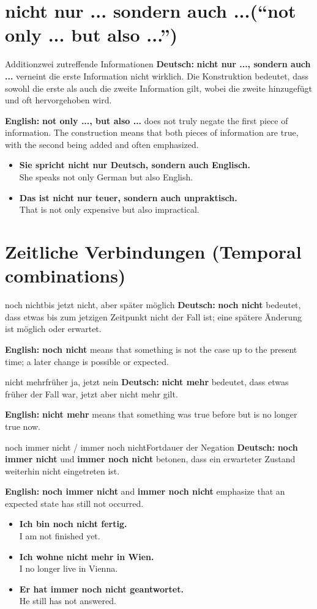 \documentclass[a4paper,11pt]{article}
\newcommand{\GermanText}[1]{\textbf{Deutsch: }#1\par}
\newcommand{\EnglishText}[1]{{\small\color{SoftGray}\textbf{English: }#1\par}}
\newcommand{\ExampleItem}[2]{\item \textbf{#1}\\{\small\color{SoftGray}#2}}
\begin{document}
\section{\glqq nicht nur ... sondern auch ...\grqq \textnormal{(``not only ... but also ...'')}}
\begin{grammarentry}{Addition}{zwei zutreffende Informationen}
\GermanText{\textbf{nicht nur ..., sondern auch ...} verneint die erste Information nicht wirklich. Die Konstruktion bedeutet, dass sowohl die erste als auch die zweite Information gilt, wobei die zweite hinzugefügt und oft hervorgehoben wird.}
\EnglishText{\textbf{not only ..., but also ...} does not truly negate the first piece of information. The construction means that both pieces of information are true, with the second being added and often emphasized.}
\end{grammarentry}
\begin{exbox}\begin{itemize}
\ExampleItem{Sie spricht nicht nur Deutsch, sondern auch Englisch.}{She speaks not only German but also English.}
\ExampleItem{Das ist nicht nur teuer, sondern auch unpraktisch.}{That is not only expensive but also impractical.}
\end{itemize}\end{exbox}

\section{Zeitliche Verbindungen \textnormal{(Temporal combinations)}}
\begin{grammarentry}{noch nicht}{bis jetzt nicht, aber später möglich}
\GermanText{\textbf{noch nicht} bedeutet, dass etwas bis zum jetzigen Zeitpunkt nicht der Fall ist; eine spätere Änderung ist möglich oder erwartet.}
\EnglishText{\textbf{noch nicht} means that something is not the case up to the present time; a later change is possible or expected.}
\end{grammarentry}
\begin{grammarentry}{nicht mehr}{früher ja, jetzt nein}
\GermanText{\textbf{nicht mehr} bedeutet, dass etwas früher der Fall war, jetzt aber nicht mehr gilt.}
\EnglishText{\textbf{nicht mehr} means that something was true before but is no longer true now.}
\end{grammarentry}
\begin{grammarentry}{noch immer nicht / immer noch nicht}{Fortdauer der Negation}
\GermanText{\textbf{noch immer nicht} und \textbf{immer noch nicht} betonen, dass ein erwarteter Zustand weiterhin nicht eingetreten ist.}
\EnglishText{\textbf{noch immer nicht} and \textbf{immer noch nicht} emphasize that an expected state has still not occurred.}
\end{grammarentry}
\begin{exbox}\begin{itemize}
\ExampleItem{Ich bin noch nicht fertig.}{I am not finished yet.}
\ExampleItem{Ich wohne nicht mehr in Wien.}{I no longer live in Vienna.}
\ExampleItem{Er hat immer noch nicht geantwortet.}{He still has not answered.}
\end{itemize}\end{exbox}
\end{document}

